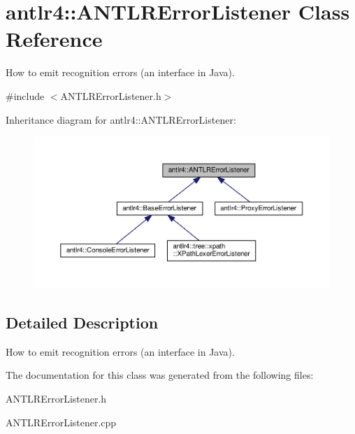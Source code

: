 \hypertarget{classantlr4_1_1ANTLRErrorListener}{}\section{antlr4\+:\+:A\+N\+T\+L\+R\+Error\+Listener Class Reference}
\label{classantlr4_1_1ANTLRErrorListener}


How to emit recognition errors (an interface in Java).  




{\ttfamily \#include $<$A\+N\+T\+L\+R\+Error\+Listener.\+h$>$}



Inheritance diagram for antlr4\+:\+:A\+N\+T\+L\+R\+Error\+Listener\+:
\nopagebreak
\begin{figure}[H]
\begin{center}
\leavevmode
\includegraphics[width=350pt]{classantlr4_1_1ANTLRErrorListener__inherit__graph}
\end{center}
\end{figure}


\subsection{Detailed Description}
How to emit recognition errors (an interface in Java). 

The documentation for this class was generated from the following files\+:\begin{DoxyCompactItemize}
\item 
A\+N\+T\+L\+R\+Error\+Listener.\+h\item 
A\+N\+T\+L\+R\+Error\+Listener.\+cpp\end{DoxyCompactItemize}
